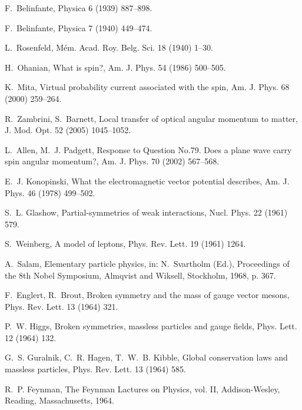 \documentclass[1p,sort&compress]{elsarticle}
\numberwithin{equation}{section}
\begin{document}
\begin{thebibliography}{999}
F.~Belinfante, Physica 6 (1939) 887--898.

F.~Belinfante, Physica 7 (1940) 449--474.

L.~Rosenfeld, M\'em. Acad. Roy. Belg. Sci. 18 (1940) 1--30.

H.~Ohanian, {What is spin?}, Am. J. Phys. 54 (1986) 500--505.

K.~Mita, {Virtual probability current associated with the spin}, Am. J. Phys.
  68 (2000) 259--264.

R.~Zambrini, S.~Barnett, {Local transfer of optical angular momentum to
  matter}, J. Mod. Opt. 52 (2005) 1045--1052.

L.~Allen, M.~J. Padgett, {Response to Question No.79. Does a plane wave carry
  spin angular momentum?}, Am. J. Phys. 70 (2002) 567--568.

E.~J. Konopinski, {What the electromagnetic vector potential describes}, Am. J.
  Phys. 46 (1978) 499--502.

S.~L. Glashow, {Partial-symmetries of weak interactions}, Nucl. Phys. 22 (1961)
  579.

S.~Weinberg, {A model of leptons}, Phys. Rev. Lett. 19 (1961) 1264.

A.~Salam, {Elementary particle physics}, in: N.~Svartholm (Ed.), {Proceedings
  of the 8th Nobel Symposium}, Almqvist and Wiksell, Stockholm, 1968, p. 367.

F.~Englert, R.~Brout, {Broken symmetry and the mass of gauge vector mesons},
  Phys. Rev. Lett. 13 (1964) 321.

P.~W. Higgs, {Broken symmetries, massless particles and gauge fields}, Phys.
  Lett. 12 (1964) 132.

G.~S. Guralnik, C.~R. Hagen, T.~W.~B. Kibble, {Global conservation laws and
  massless particles}, Phys. Rev. Lett. 13 (1964) 585.

R.~P. Feynman, {The Feynman Lactures on Physics, vol. II}, Addison-Wesley,
  Reading, Massachusetts, 1964.

\end{thebibliography}
\end{document}
